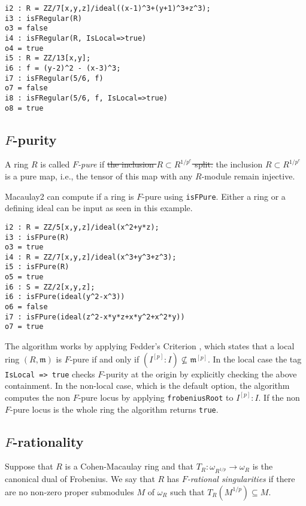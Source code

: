\documentclass{amsart}
\begin{document}
\medskip
\begin{verbatim}
i2 : R = ZZ/7[x,y,z]/ideal((x-1)^3+(y+1)^3+z^3);
i3 : isFRegular(R)
o3 = false
i4 : isFRegular(R, IsLocal=>true)
o4 = true
i5 : R = ZZ/13[x,y];
i6 : f = (y-2)^2 - (x-3)^3;
i7 : isFRegular(5/6, f)
o7 = false
i8 : isFRegular(5/6, f, IsLocal=>true)
o8 = true
\end{verbatim}
\medskip

\subsection{$F$-purity}
\begin{definition}
A ring $R$ is called \emph{$F$-pure} if 
\sout{the inclusion $R \subset R^{1/p^{e}}$ split.}
the inclusion $R \subset R^{1/p^{e}}$ is a pure map, i.e.,
the tensor of this map with any $R$-module remain injective.
\end{definition}

Macaulay2 can compute if a ring is $F$-pure using \texttt{isFPure}. Either a
ring or a defining ideal can be input as seen in this example.


\medskip
\begin{verbatim}
i2 : R = ZZ/5[x,y,z]/ideal(x^2+y*z);
i3 : isFPure(R)
o3 = true
i4 : R = ZZ/7[x,y,z]/ideal(x^3+y^3+z^3);
i5 : isFPure(R)
o5 = true
i6 : S = ZZ/2[x,y,z];
i6 : isFPure(ideal(y^2-x^3))
o6 = false
i7 : isFPure(ideal(z^2-x*y*z+x*y^2+x^2*y))
o7 = true
\end{verbatim}
\medskip


The algorithm works by applying Fedder's Criterion {\cite{FedderFPureRat}}, which states that a
local ring $(R, \mathfrak{m})$ is $F$-pure if and only if $(I^{[p]} : I)
\not\subseteq \mathfrak{m}^{[p]}$. In the local case the tag \texttt{IsLocal
=> true} checks $F$-purity at the origin by explicitly checking the above
containment. In the non-local case, which is the default option, the
algorithm computes the non $F$-pure locus by applying \texttt{frobeniusRoot}
to $I^{[p]} :I$. If the non $F$-pure locus is the whole ring the algorithm
returns \texttt{true}.

\subsection{$F$-rationality}

\begin{definition}
Suppose that $R$ is a Cohen-Macaulay ring and that $T_{R} :
\omega_{R^{1/p}} \rightarrow \omega_{R}$ is the canonical dual of
Frobenius. We say that $R$ has \emph{$F$-rational singularities} if there
are no non-zero proper submodules $M$ of $\omega_{R}$ such that
$T_{R}(M^{1/p}) \subseteq M$.
\end{definition}
\end{document}
